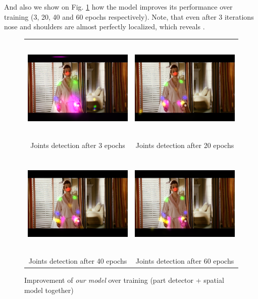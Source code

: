 \documentclass[a4paper,10pt]{article}
\begin{document}
	\newpage	
	And also we show on Fig. \ref{appendix_evolution} how the model improves its performance over training (3, 20, 40 and 60 epochs respectively). Note, that even after 3 iterations nose and shoulders are almost perfectly localized, which reveals .
	\begin{figure}[H]
		\begin{tabular}{cc}
			\includegraphics[height=5cm]{img/ap_epoch3.png} & 
			\includegraphics[height=5cm]{img/ap_epoch20.png} \\
			Joints detection after 3 epochs & Joints detection after 20 epochs \\
			& \\
			\includegraphics[height=5cm]{img/ap_epoch40.png} &
			\includegraphics[height=5cm]{img/ap_epoch60.png} \\
			Joints detection after 40 epochs & Joints detection after 60 epochs
			\caption{Improvement of \textit{our model} over training (part detector + spatial model together)}
			\label{appendix_evolution}
		\end{tabular}
	\end{figure}
\end{document}

